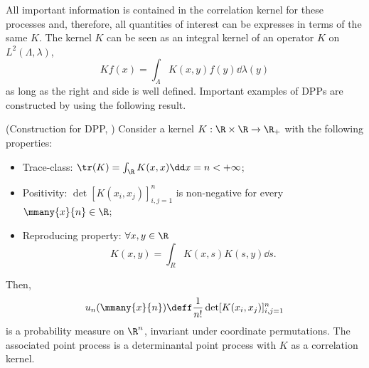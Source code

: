 All important information is contained in the correlation kernel for these processes and, therefore, all quantities of interest can be expresses in terms of the same $K$. The kernel $K$ can be seen as an integral kernel of an operator $K$ on $L^2(\Lambda, \lambda)$,
\begin{equation}
	Kf(x) = \int_\Lambda K(x, y) f(y) \dd \lambda(y)
	\label{Equation: integral operator K}
\end{equation}
as long as the right and side is well defined. Important examples of DPPs are constructed by using the following result.

\begin{teorema} (Construction for DPP, \cite{ManuelaGirottiPhD})
	Consider a kernel $K: \R \times \R \rightarrow \R_+$ with the following properties:
	\begin{itemize}
		\item Trace-class: $\tr(K) = \int_{\R} K(x,x) \dd x = n < + \infty$;
		\item Positivity: $\det[K(x_i, x_j)]_{i,j=1}^n$ is non-negative for every $\mmany{x}{n} \in \R$;
		\item Reproducing property: $\forall x, y \in \R$
		\begin{equation}
			K(x,y) = \int_{R} K(x, s) K(s, y) \dd s.
		\end{equation}
	\end{itemize}
	Then, 
	\begin{equation}
		u_n(\mmany{x}{n}) \deff \frac{1}{n!} \det[K(x_i, x_j)]_{i,j = 1}^n
	\end{equation}
	is a probability measure on $\R^n$, invariant under coordinate permutations. The associated point process is a determinantal point process with $K$ as a correlation kernel.
\end{teorema}

